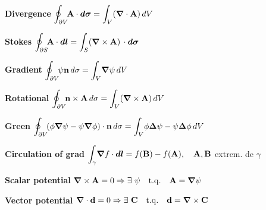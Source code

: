 \begin{squishlist}
\item \textbf{Divergence} \quad$\displaystyle{\oint_{\partial V}} \! \vec{\rm{A}} \cdot \vec{d\sigma} = \displaystyle{\int_V} (\vec{\nabla} \cdot \vec{\rm{A}}) \, dV$

\item \textbf{Stokes} \quad
$\displaystyle{\oint_{\partial S}} \! \vec{\rm{A}} \cdot \vec{dl} = \displaystyle{\int_S} (\vec{\nabla} \times \vec{\rm{A}}) \, \cdot \vec{d\sigma}$
 
\item \textbf{Gradient} \quad
$\displaystyle{\oint_{\partial V}} \! \psi\vec{\rm{n}} \, d\sigma = \displaystyle{\int_V} \vec{\nabla}\psi \, dV$
 
\item \textbf{Rotational} \quad
$\displaystyle{\oint_{\partial V}} \! \vec{\rm{n}} \times \vec{\rm{A}} \, d\sigma = \displaystyle{\int_V} (\vec{\nabla} \times \vec{\rm{A}}) \, dV$
 
\item \textbf{Green} \quad
$\displaystyle{\oint_{\partial V}} \! (\phi\vec{\nabla}\psi - \psi\vec{\nabla}\phi)\cdot\vec{\rm{n}} \, d\sigma = \displaystyle{\int_V} \phi\vec{\Delta}\psi - \psi\vec{\Delta}\phi \, dV$
 
\item \textbf{Circulation of grad} \quad
$\displaystyle{\int_{\gamma}} \vec{\nabla}f\cdot\vec{dl} = f(\vec{\rm B}) - f(\vec{\rm A}), \quad \vec{\rm{A}}, \vec{\rm{B}}$ extrem. de $\gamma$ 
 
\item \textbf{Scalar potential} \quad
$\vec{\nabla} \times \vec{\rm{A}} = 0 \Rightarrow \exists \ \psi \quad \mathrm{t.q.} \quad \vec{\rm{A}} = \vec{\nabla}\psi$
 
\item \textbf{Vector potential} \quad
$\vec{\nabla}\cdot\vec{\rm{d} } = 0 \Rightarrow \exists \ \vec{\rm{C}} \quad \mathrm{t.q.} \quad \vec{\rm{d} } = \vec{\nabla} \times \vec{\rm C}$
\end{squishlist} 

